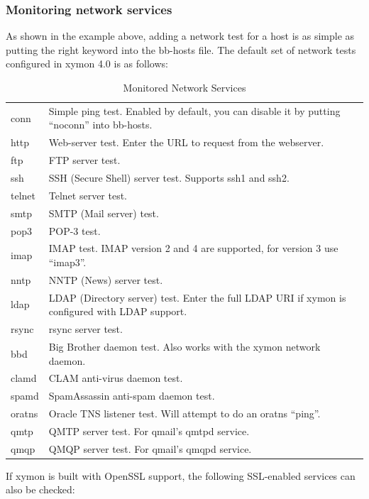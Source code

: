 \subsubsection{Monitoring network services}


 As shown in the example above, adding a network test for a host is as
 simple as putting the right keyword into the bb-hosts file. The
 default set of network tests configured in xymon 4.0 is as follows:

\begin{table} \centering \caption{Monitored Network Services} \label{Monitored_Network_Services}
\begin{tabular}{l|l}
conn & Simple ping test. Enabled by default, you can disable it by putting ``noconn'' into bb-hosts.\\
http & Web-server test. Enter the URL to request from the webserver. \\
ftp & FTP server test. \\
ssh & SSH (Secure Shell) server test. Supports ssh1 and ssh2. \\
telnet & Telnet server test. \\
smtp & SMTP (Mail server) test.\\ 
pop3 & POP-3 test. \\
imap & IMAP test. IMAP version 2 and 4 are supported, for version 3 use ``imap3''. \\
nntp & NNTP (News) server test. \\
ldap & LDAP (Directory server) test. Enter the full LDAP URI if xymon is configured with LDAP support. \\
rsync & rsync server test. \\
bbd & Big Brother daemon test. Also works with the xymon network daemon. \\
clamd & CLAM anti-virus daemon test. \\
spamd & SpamAssassin anti-spam daemon test. \\
oratns & Oracle TNS listener test. Will attempt to do an oratns ``ping''. \\
qmtp & QMTP server test. For qmail's qmtpd service. \\
qmqp & QMQP server test. For qmail's qmqpd service.
\end{tabular}

\end{table}

 If xymon is built with OpenSSL support, the following SSL-enabled services can also be checked:

